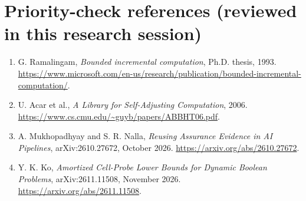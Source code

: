 \documentclass[11pt,letterpaper]{article}
\begin{document}
\section*{Priority-check references (reviewed in this research session)}
\begin{enumerate}[leftmargin=*,itemsep=2pt]
\item G. Ramalingam, \emph{Bounded incremental computation}, Ph.D. thesis, 1993. \url{https://www.microsoft.com/en-us/research/publication/bounded-incremental-computation/}.
\item U. Acar et al., \emph{A Library for Self-Adjusting Computation}, 2006. \url{https://www.cs.cmu.edu/~guyb/papers/ABBHT06.pdf}.
\item A. Mukhopadhyay and S. R. Nalla, \emph{Reusing Assurance Evidence in AI Pipelines}, arXiv:2610.27672, October 2026. \url{https://arxiv.org/abs/2610.27672}.
\item Y. K. Ko, \emph{Amortized Cell-Probe Lower Bounds for Dynamic Boolean Problems}, arXiv:2611.11508, November 2026. \url{https://arxiv.org/abs/2611.11508}.
\end{enumerate}
\end{document}
